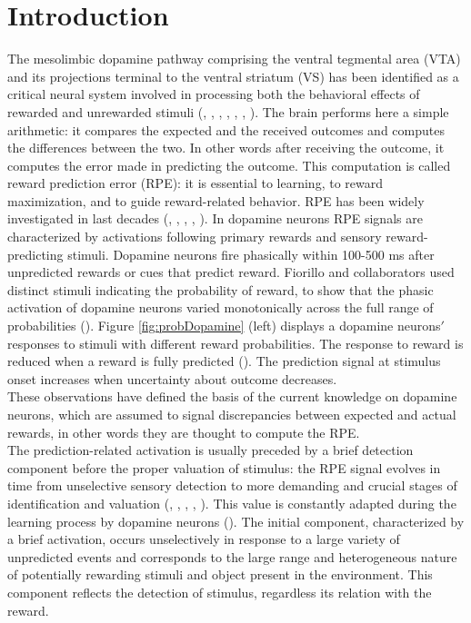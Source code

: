 \chapter{Introduction}
\label{chap:Introduction}
The mesolimbic dopamine pathway comprising the ventral tegmental area (VTA) and its projections terminal to the ventral striatum (VS) has been identified as a critical neural system involved in processing both the behavioral effects of rewarded and unrewarded stimuli (\cite{Schultz1992}, \cite{Montague}, \cite{Ungless2004}, \cite{Sun2014}, \cite{Tobler2003}, \cite{UchidaDop1}, \cite{Takahashi2016}). The brain performs here a simple arithmetic: it compares the expected and the received outcomes and computes the differences between the two. In other words after receiving the outcome, it computes the error made in predicting the outcome. This computation is called reward prediction  error (RPE): it is essential to learning, to reward maximization, and to guide reward-related behavior. RPE has been widely investigated in last decades (\cite{Schultz1997}, \cite{UchidaDop}, \cite{Fiorillo}, \cite{Pagnoni}, \cite{Schultz2016}). In dopamine neurons RPE signals are characterized by activations following primary rewards and sensory reward-predicting stimuli. Dopamine neurons fire phasically within 100-500 ms after unpredicted rewards or cues that predict reward. Fiorillo and collaborators used distinct stimuli indicating the probability of reward, to show that the phasic activation of dopamine neurons varied monotonically across the full range of probabilities (\cite{Fiorillo}). Figure \ref{fig:probDopamine} (left) displays a dopamine neurons$'$ responses to stimuli with different reward probabilities. The response to reward is reduced when a reward is fully predicted (\cite{Uchida}). The prediction signal at stimulus onset increases when uncertainty about outcome decreases.\\These observations have defined the basis of the current knowledge on dopamine neurons, which are assumed to signal discrepancies between expected and actual rewards, in other words they are thought to compute the RPE.\\The prediction-related activation is usually preceded by a brief detection component before the proper valuation of stimulus: the RPE signal evolves in time from unselective sensory detection to more demanding and crucial stages of identification and valuation (\cite{Tobler2003}, \cite{Nomoto2010}, \cite{Fiorillo2013}, \cite{deLafuente}, \cite{Schultz2016}). This value is constantly adapted during the learning process by dopamine neurons (\cite{Tobler2005}). The initial component, characterized by a brief activation, occurs unselectively in response to a large variety of unpredicted events and corresponds to the large range and heterogeneous nature of potentially rewarding stimuli and object present in the environment. This component reflects the detection of stimulus, regardless its relation with the reward.
